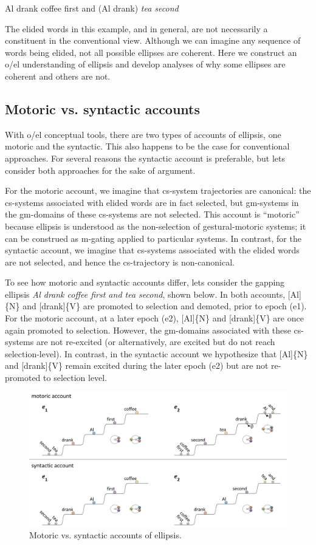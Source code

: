 \ea
  {Al drank coffee first and} (Al drank) \textit{tea second}
\z

  The elided words in this example, and in general, are not necessarily a constituent in the conventional view. Although we can imagine any sequence of words being elided, not all possible ellipses are coherent. Here we construct an o/el understanding of ellipsis and develop analyses of why some ellipses are coherent and others are not.

\subsection{Motoric vs. syntactic accounts}

With o/el conceptual tools, there are two types of accounts of ellipsis, one motoric and the syntactic. This also happens to be the case for conventional approaches. For several reasons the syntactic account is preferable, but lets consider both approaches for the sake of argument. 

  For the motoric account, we imagine that cs-system trajectories are canonical: the cs-systems associated with elided words are in fact selected, but gm-systems in the gm-domains of these cs-systems are not selected. This account is “motoric” because ellipsis is understood as the non-selection of gestural-motoric systems; it can be construed as m-gating applied to particular systems. In contrast, for the syntactic account, we imagine that cs-systems associated with the elided words are not selected, and hence the cs-trajectory is non-canonical.

  To see how motoric and syntactic accounts differ, lets consider the gapping ellipsis \textit{Al drank coffee first and tea second}, shown below. In both accounts, [Al]\{N\} and [drank]\{V\} are promoted to selection and demoted, prior to epoch (e1). For the motoric account, at a later epoch (e2), [Al]\{N\} and [drank]\{V\} are once again promoted to selection. However, the gm-domains associated with these cs-systems are not re-excited (or alternatively, are excited but do not reach selection-level). In contrast, in the syntactic account we hypothesize that [Al]\{N\} and [drank]\{V\} remain excited during the later epoch (e2) but are not re-promoted to selection level. 

  
\begin{figure}
\includegraphics[width=\textwidth]{figures/Tilsen-img145.png}
\caption{Motoric vs. syntactic accounts of ellipsis.}
\label{fig:7:1}
\end{figure}
 

